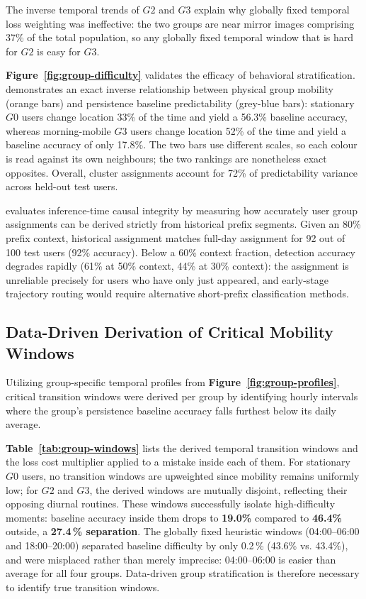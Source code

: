 The inverse temporal trends of $G2$ and $G3$ explain why globally fixed temporal loss weighting was ineffective: the two groups are near mirror images comprising 37\% of the total population, so any globally fixed temporal window that is hard for $G2$ is easy for $G3$.

\textbf{Figure~\ref{fig:group-difficulty}} validates the efficacy of behavioral stratification. \textbf{} demonstrates an exact inverse relationship between physical group mobility (orange bars) and persistence baseline predictability (grey-blue bars): stationary $G0$ users change location 33\% of the time and yield a 56.3\% baseline accuracy, whereas morning-mobile $G3$ users change location 52\% of the time and yield a baseline accuracy of only 17.8\%. The two bars use different scales, so each colour is read against its own neighbours; the two rankings are nonetheless exact opposites. Overall, cluster assignments account for 72\% of predictability variance across held-out test users.



\textbf{} evaluates inference-time causal integrity by measuring how accurately user group assignments can be derived strictly from historical prefix segments. Given an 80\% prefix context, historical assignment matches full-day assignment for 92 out of 100 test users (92\% accuracy). Below a 60\% context fraction, detection accuracy degrades rapidly (61\% at 50\% context, 44\% at 30\% context): the assignment is unreliable precisely for users who have only just appeared, and early-stage trajectory routing would require alternative short-prefix classification methods.

\subsection{Data-Driven Derivation of Critical Mobility Windows}

Utilizing group-specific temporal profiles from \textbf{Figure~\ref{fig:group-profiles}}, critical transition windows were derived per group by identifying hourly intervals where the group's persistence baseline accuracy falls furthest below its daily average.

\textbf{Table~\ref{tab:group-windows}} lists the derived temporal transition windows and the loss cost multiplier applied to a mistake inside each of them. For stationary $G0$ users, no transition windows are upweighted since mobility remains uniformly low; for $G2$ and $G3$, the derived windows are mutually disjoint, reflecting their opposing diurnal routines. These windows successfully isolate high-difficulty moments: baseline accuracy inside them drops to \textbf{19.0\%} compared to \textbf{46.4\%} outside, a \textbf{27.4\,\% separation}. The globally fixed heuristic windows (04:00--06:00 and 18:00--20:00) separated baseline difficulty by only 0.2\,\% (43.6\% vs. 43.4\%), and were misplaced rather than merely imprecise: 04:00--06:00 is easier than average for all four groups. Data-driven group stratification is therefore necessary to identify true transition windows.

